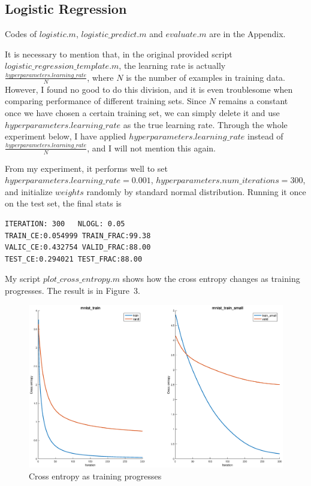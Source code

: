 \documentclass{article}
\begin{document}
\subsection{Logistic Regression}
Codes of $logistic.m$, $logistic\_predict.m$ and $evaluate.m$ are in the Appendix.

It is necessary to mention that, in the original provided script\\$logistic\_regression\_template.m$, the learning rate is actually\\$\frac{hyperparameters.learning\_rate}{N}$, where $N$ is the number of examples in training data. However, I found no good to do this division, and it is even troublesome when comparing performance of different training sets. Since $N$ remains a constant once we have chosen a certain training set, we can simply delete it and use $hyperparameters.learning\_rate$ as the true learning rate. Through the whole experiment below, I have applied $hyperparameters.learning\_rate$ instead of $\frac{hyperparameters.learning\_rate}{N}$, and I will not mention this again.

From my experiment, it performs well to set\\$hyperparameters.learning\_rate=0.001$, $hyperparameters.num\_iterations = 300$, and initialize $weights$ randomly by standard normal distribution. Running it once on the test set, the final stats is 
\begin{lstlisting}
ITERATION: 300   NLOGL: 0.05
TRAIN_CE:0.054999 TRAIN_FRAC:99.38
VALIC_CE:0.432754 VALID_FRAC:88.00
TEST_CE:0.294021 TEST_FRAC:88.00
\end{lstlisting}

My script $plot\_cross\_entropy.m$ shows how the cross entropy changes as training progresses. The result is in Figure~3.
\begin{figure}
\centering
\includegraphics[scale=0.25]{3.eps}
\caption{Cross entropy as training progresses}
\end{figure}
\end{document}
